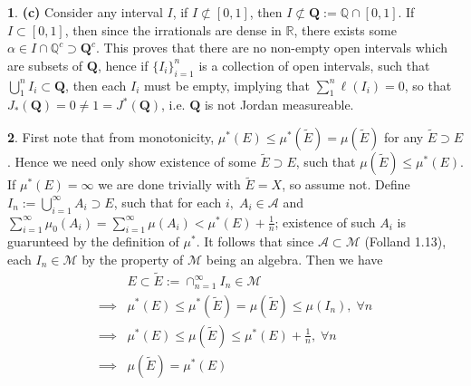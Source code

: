 \documentclass[10.5pt]{article}
\theoremstyle{definition}
\newtheorem{pb}{}
\newcommand{\set}[1]{\{#1\}}
\begin{document}
\begin{pb}
		\textbf{(c)} Consider any interval \(I\), if \(I \not \subset [0,1]\), then \(I \not \subset \mathbf{Q} := \mathbb{Q}\cap[0,1]\). If
		\(I \subset [0,1]\), then since the irrationals are dense in \(\mathbb{R}\), there exists some \(\alpha \in I \cap \mathbb{Q}^c \supset \mathbf{Q}^c\).
		This proves that there are no non-empty open intervals which are subsets of \(\mathbf{Q}\), hence if \(\set{I_i}_{i=1}^n\) is a collection of open
		intervals, such that \(\bigcup_1^n I_i \subset \mathbf{Q}\), then each \(I_i\) must be empty, implying that \(\sum_1^n \ell(I_i) = 0\), so that
		\(J_*(\mathbf{Q}) = 0 \neq 1 = J^*(\mathbf{Q})\), i.e. \(\mathbf{Q}\) is not Jordan measureable.
	\end{pb}
	\begin{pb}
		First note that from monotonicity, \(\mu^*(E) \leq \mu^*(\tilde{E}) = \mu(\tilde{E})\) for any \(\tilde{E}\supset E\). Hence we need only show existence of some \(\tilde{E} \supset E\), such that
		\(\mu(\tilde{E}) \leq \mu^*(E)\). If \(\mu^*(E) = \infty\) we are done trivially with \(\tilde{E} = X\), so assume not. Define \(I_n := \bigcup_{i=1}^\infty A_i \supset E\), 
		such that for each \(i, \; A_i \in \mathcal{A}\)
		and \(\sum_{i=1}^\infty \mu_0(A_i) = \sum_{i=1}^\infty \mu(A_i) < \mu^*(E) + \frac{1}{n}\); existence of such \(A_i\) is guarunteed by the definition of \(\mu^*\).
		It follows that since \(\mathcal{A} \subset \mathcal{M}\) (Folland 1.13), each \(I_n \in \mathcal{M}\) by the property of \(\mathcal{M}\) being an algebra. Then we have 
		\begin{align*}
			&E \subset \tilde{E} := \cap_{n=1}^\infty I_n \in \mathcal{M}\\
			\implies &\mu^*(E) \leq \mu^*(\tilde{E}) = \mu(\tilde{E}) \leq \mu(I_n), \; \forall n \\
			\implies &\mu^*(E) \leq \mu(\tilde{E}) \leq \mu^*(E) + \frac{1}{n}, \; \forall n \\
			\implies &\mu(\tilde{E}) = \mu^*(E)
		\end{align*}
	\end{pb}
\end{document}
